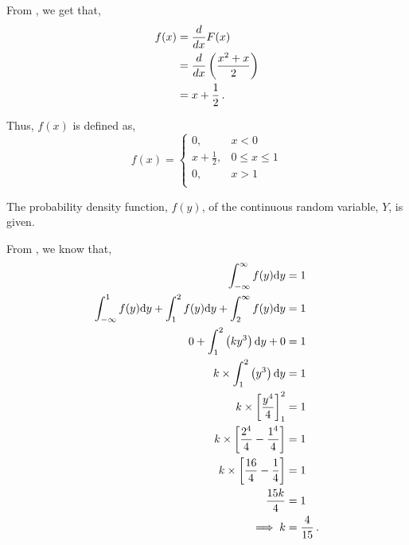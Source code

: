 \begin{subquestions}
\begin{subsubquestions}

\subsubquestion

From , we get that,
\begin{align}
	f(x) & = \frac{d}{dx}F(x) \nonumber \\
	     & = \frac{d}{dx}\left(\frac{x^2+x}{2} \right) \nonumber \\
	     & = x + \frac{1}{2} \,.
\end{align}

Thus, $f(x)$ is defined as,
\[ f(x) = 
\begin{cases}
	0, & x<0 \\
	x + \frac{1}{2}, & 0 \leq  x \leq 1 \\
	0, & x>1 \\
\end{cases}
\]

\end{subsubquestions}	
	

\subquestion

The probability density function, $f(y)$, of the continuous random variable, $Y$, is given.

\begin{subsubquestions}
	
\subsubquestion

From , we know that,
\begin{align}
	\int_{-\infty}^{\infty} f(y)\mathrm{d}y & = 1 \nonumber \\
	\int_{-\infty}^{1} f(y)\mathrm{d}y + \int_{1}^{2} f(y)\mathrm{d}y + \int_{2}^{\infty} f(y)\mathrm{d}y & = 1 \nonumber \\
	0 + \int_{1}^{2} \left(ky^3\right)\mathrm{d}y + 0 & = 1 \nonumber \\
	k \times \int_{1}^{2} \left(y^3\right)\mathrm{d}y & = 1 \nonumber \\
	k \times \left[\frac{y^4}{4} \right]^2_1 & = 1 \nonumber \\
	k \times \left[\frac{2^4}{4} - \frac{1^4}{4}\right] & = 1 \nonumber \\
	k \times \left[\frac{16}{4}- \frac{1}{4}\right] & = 1 \nonumber \\
	\frac{15k}{4} & = 1 \nonumber \\
	\implies k & = \frac{4}{15} \,.
\end{align}
	

\end{subsubquestions}
\end{subquestions}
